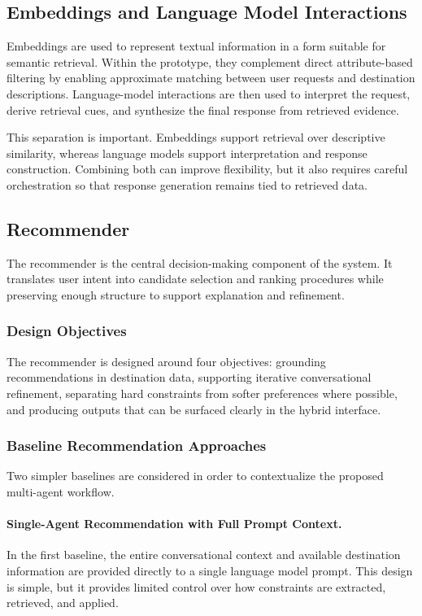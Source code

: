 \subsection{Embeddings and Language Model Interactions}\label{subsection:system-architecture:embeddings-llm}
Embeddings are used to represent textual information in a form suitable for semantic retrieval. Within the prototype, they complement direct attribute-based filtering by enabling approximate matching between user requests and destination descriptions. Language-model interactions are then used to interpret the request, derive retrieval cues, and synthesize the final response from retrieved evidence.

This separation is important. Embeddings support retrieval over descriptive similarity, whereas language models support interpretation and response construction. Combining both can improve flexibility, but it also requires careful orchestration so that response generation remains tied to retrieved data.

\subsection{Recommender}\label{subsection:system-architecture:recommender}
The recommender is the central decision-making component of the system. It translates user intent into candidate selection and ranking procedures while preserving enough structure to support explanation and refinement.

\subsubsection{Design Objectives}\label{subsubsection:system-architecture:design-objectives}
The recommender is designed around four objectives: grounding recommendations in destination data, supporting iterative conversational refinement, separating hard constraints from softer preferences where possible, and producing outputs that can be surfaced clearly in the hybrid interface.

\subsubsection{Baseline Recommendation Approaches}\label{subsubsection:system-architecture:baselines}
Two simpler baselines are considered in order to contextualize the proposed multi-agent workflow.

\paragraph{Single-Agent Recommendation with Full Prompt Context.}
In the first baseline, the entire conversational context and available destination information are provided directly to a single language model prompt. This design is simple, but it provides limited control over how constraints are extracted, retrieved, and applied.

